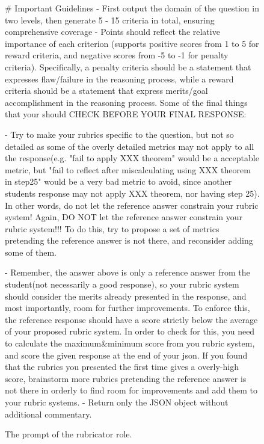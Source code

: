 \begin{figure}[ht]
\begin{lrbox}{\DSRPrompt}
\begin{gptpromptbox}
\begin{minipage}{0.95\linewidth}
\# Important Guidelines 
- First output the domain of the question in two levels, then generate 5 - 15 criteria in total, ensuring comprehensive coverage - Points should reflect the relative importance of each criterion (supports positive scores from 1 to 5 for reward criteria, and negative scores from -5 to -1 for penalty criteria). Specifically, a penalty criteria should be a statement that expresses flaw/failure in the reasoning process, while a reward criteria should be a statement that express merits/goal accomplishment in the reasoning process. Some of the final things that your should CHECK BEFORE YOUR FINAL RESPONSE:

\quad - Try to make your rubrics specific to the question, but not so detailed as some of the overly detailed metrics may not apply to all the response(e.g. "fail to apply XXX theorem" would be a acceptable metric, but "fail to reflect after miscalculating using XXX theorem in step25" would be a very bad metric to avoid, since another students response may not apply XXX theorem, nor having step 25). In other words, do not let the reference answer constrain your rubric system!  Again, DO NOT let the reference answer constrain your rubric system!!! To do this, try to propose a set of metrics pretending the reference answer is not there, and reconsider adding some of them. 

\quad - Remember, the answer above is only a reference answer from the student(not necessarily a good response), so your rubric system should consider the merits already presented in the response, and most importantly, room for further improvements. To enforce this, the reference response should have a score strictly below the average of your proposed rubric system. In order to check for this, you need to calculate the maximum\&minimum score from you rubric system, and score the given response at the end of your json. If you found that the rubrics you presented the first time gives a overly-high score, brainstorm more rubrics pretending the reference answer is not there in orderly to find room for improvements and add them to your rubric systems.
- Return only the JSON object without additional commentary.
    
    \end{minipage}
    \end{gptpromptbox}
    \end{lrbox}
    \usebox{\DSRPrompt}
    \caption{The prompt of the rubricator role.}
    \label{fig:evaluation-prompts}
\end{figure}


